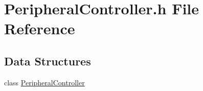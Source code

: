 \hypertarget{a00035}{\section{Peripheral\-Controller.\-h File Reference}
\label{a00035}
}
\subsection*{Data Structures}
\begin{DoxyCompactItemize}
\item 
class \hyperlink{a00011}{Peripheral\-Controller}
\end{DoxyCompactItemize}
